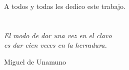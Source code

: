 A todos y todas les dedico este trabajo.



\cleardoublepage %
\chapter*{}
\setlength{\leftmargin}{0.5\textwidth}
\setlength{\parsep}{0cm}
\addtolength{\topsep}{0.5cm}
\begin{flushright}
\em{
El modo de dar una vez en el clavo\\
es dar cien veces en la herradura.
}
\end{flushright}
\begin{flushright}
{
Miguel de Unamuno
}
\end{flushright}
\cleardoublepage %
